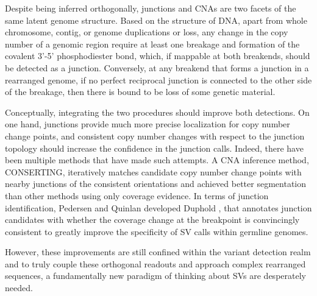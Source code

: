 \documentclass[phd,tocprelim]{cornell}
\begin{document}
Despite being inferred orthogonally, junctions and CNAs are two facets of the same latent genome structure. Based on the structure of DNA, apart from whole chromosome, contig, or genome duplications or loss, any change in the copy number of a genomic region require at least one breakage and formation of the covalent 3'-5' phosphodiester bond, which, if mappable at both breakends, should be detected as a junction. Conversely, at any breakend that forms a junction in a rearranged genome, if no perfect reciprocal junction is connected to the other side of the breakage, then there is bound to be loss of some genetic material.

Conceptually, integrating the two procedures should improve both detections. On one hand, junctions provide much more precise localization for copy number change points, and consistent copy number changes with respect to the junction topology should increase the confidence in the junction calls. Indeed, there have been multiple methods that have made such attempts. A CNA inference method, CONSERTING\cite{Chen2015-sw}, iteratively matches candidate copy number change points with nearby junctions of the consistent orientations and achieved better segmentation than other methods using only coverage evidence. In terms of junction identification, Pedersen and Quinlan developed Duphold \cite{Pedersen2019-pp}, that annotates junction candidates with whether the coverage change at the breakpoint is convincingly consistent to greatly improve the specificity of SV calls within germline genomes.

However, these improvements are still confined within the variant detection realm and to truly couple these orthogonal readouts and approach complex rearranged sequences, a fundamentally new paradigm of thinking about SVs are desperately needed.
\end{document}
